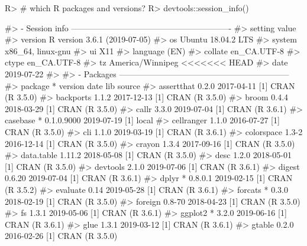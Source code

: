 \documentclass[
]{jss}
\begin{document}
\begin{CodeChunk}

\begin{CodeInput}
R> # which R packages and versions?
R> devtools::session_info()
\end{CodeInput}

\begin{CodeOutput}
#> - Session info ----------------------------------------------------------
#>  setting  value                       
#>  version  R version 3.6.1 (2019-07-05)
#>  os       Ubuntu 18.04.2 LTS          
#>  system   x86_64, linux-gnu           
#>  ui       X11                         
#>  language (EN)                        
#>  collate  en_CA.UTF-8                 
#>  ctype    en_CA.UTF-8                 
#>  tz       America/Winnipeg            
<<<<<<< HEAD
#>  date     2019-07-22                  
#> 
#> - Packages --------------------------------------------------------------
#>  package     * version    date       lib source                          
#>  assertthat    0.2.0      2017-04-11 [1] CRAN (R 3.5.0)                  
#>  backports     1.1.2      2017-12-13 [1] CRAN (R 3.5.0)                  
#>  broom         0.4.4      2018-03-29 [1] CRAN (R 3.5.0)                  
#>  callr         3.3.0      2019-07-04 [1] CRAN (R 3.6.1)                  
#>  casebase    * 0.1.0.9000 2019-07-19 [1] local                           
#>  cellranger    1.1.0      2016-07-27 [1] CRAN (R 3.5.0)                  
#>  cli           1.1.0      2019-03-19 [1] CRAN (R 3.6.1)                  
#>  colorspace    1.3-2      2016-12-14 [1] CRAN (R 3.5.0)                  
#>  crayon        1.3.4      2017-09-16 [1] CRAN (R 3.5.0)                  
#>  data.table    1.11.2     2018-05-08 [1] CRAN (R 3.5.0)                  
#>  desc          1.2.0      2018-05-01 [1] CRAN (R 3.5.0)                  
#>  devtools      2.1.0      2019-07-06 [1] CRAN (R 3.6.1)                  
#>  digest        0.6.20     2019-07-04 [1] CRAN (R 3.6.1)                  
#>  dplyr       * 0.8.0.1    2019-02-15 [1] CRAN (R 3.5.2)                  
#>  evaluate      0.14       2019-05-28 [1] CRAN (R 3.6.1)                  
#>  forcats     * 0.3.0      2018-02-19 [1] CRAN (R 3.5.0)                  
#>  foreign       0.8-70     2018-04-23 [1] CRAN (R 3.5.0)                  
#>  fs            1.3.1      2019-05-06 [1] CRAN (R 3.6.1)                  
#>  ggplot2     * 3.2.0      2019-06-16 [1] CRAN (R 3.6.1)                  
#>  glue          1.3.1      2019-03-12 [1] CRAN (R 3.6.1)                  
#>  gtable        0.2.0      2016-02-26 [1] CRAN (R 3.5.0)                  

\end{CodeOutput}
\end{CodeChunk}
\end{document}

